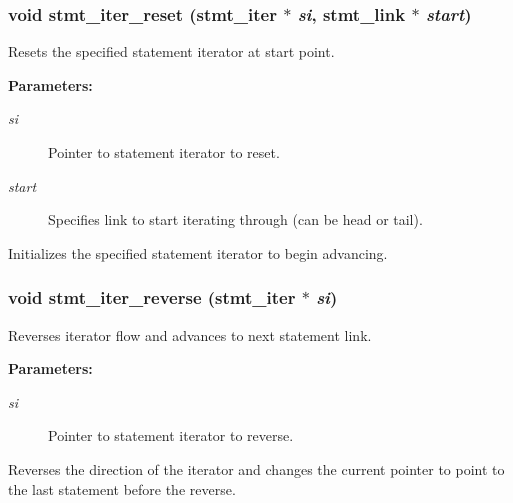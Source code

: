 \subsubsection{\setlength{\rightskip}{0pt plus 5cm}void stmt\_\-iter\_\-reset ({\bf stmt\_\-iter} $\ast$ {\em si}, {\bf stmt\_\-link} $\ast$ {\em start})}\label{iter_8c_a0}


Resets the specified statement iterator at start point.

\begin{Desc}
\item[{\bf Parameters: }]\par
\begin{description}
\item[
{\em si}]Pointer to statement iterator to reset. \item[
{\em start}]Specifies link to start iterating through (can be head or tail).

\end{description}
\end{Desc}
Initializes the specified statement iterator to begin advancing. 
\subsubsection{\setlength{\rightskip}{0pt plus 5cm}void stmt\_\-iter\_\-reverse ({\bf stmt\_\-iter} $\ast$ {\em si})}\label{iter_8c_a2}


Reverses iterator flow and advances to next statement link.

\begin{Desc}
\item[{\bf Parameters: }]\par
\begin{description}
\item[
{\em si}]Pointer to statement iterator to reverse.

\end{description}
\end{Desc}
Reverses the direction of the iterator and changes the current pointer to point to the last statement before the reverse. 